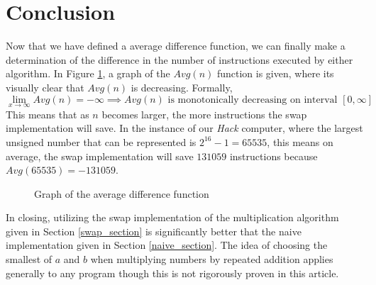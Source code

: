 \documentclass[a4paper,10pt,fleqn]{article}
\begin{document}
\section{Conclusion}
Now that we have defined a average difference function, we can finally make a determination of
the difference in the number of instructions executed by either algorithm. In Figure
\ref{fig:avg_graph}, a graph of the $Avg(n)$ function is given, where its visually clear that
$Avg(n)$ is decreasing. Formally,
\begin{equation*}
\lim_{x \to \infty} Avg(n) = -\infty \implies Avg(n) \text{ is monotonically decreasing on interval } [0,\infty]
\end{equation*}
This means that as $n$ becomes larger, the more instructions the swap implementation will save.
In the instance of our \emph{Hack} computer, where the largest unsigned number that can be
represented is $2^{16}-1 = 65535$, this means on average, the swap implementation will save
$131059$ instructions because $Avg(65535) = -131059$.

\begin{figure}
  \label{fig:avg_graph}
  \centering
  \caption{Graph of the average difference function}
\end{figure}

In closing, utilizing the swap implementation of the multiplication algorithm given in Section
\ref{swap_section} is significantly better that the naive implementation given in Section
\ref{naive_section}. The idea of choosing the smallest of $a$ and $b$ when multiplying numbers
by repeated addition applies generally to any program though this is not rigorously proven in
this article.
\end{document}
